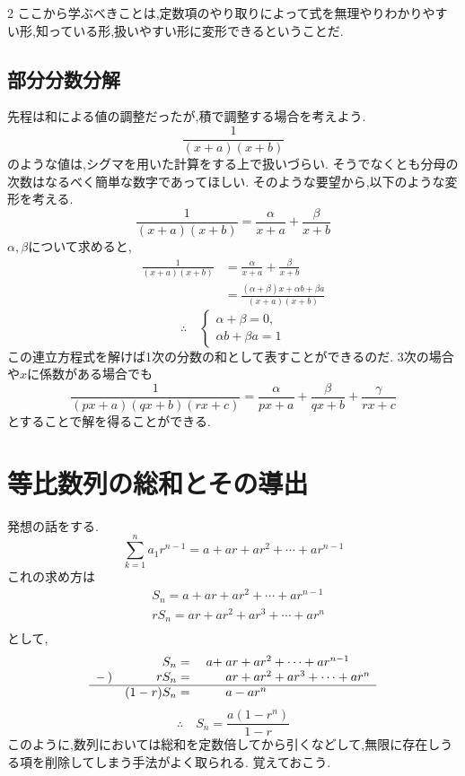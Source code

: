 \documentclass[dvipdfmx,a4paper,11pt,fleqn,openany]{jsbook}
\begin{document}
\begin{multicols*}{2}
      ここから学ぶべきことは,定数項のやり取りによって式を無理やりわかりやすい形,知っている形,扱いやすい形に変形できるということだ.

    \subsection{部分分数分解}
      先程は和による値の調整だったが,積で調整する場合を考えよう.
      \[
        \frac{1}{(x+a)(x+b)}
      \]
      のような値は,シグマを用いた計算をする上で扱いづらい.
      そうでなくとも分母の次数はなるべく簡単な数字であってほしい.
      そのような要望から,以下のような変形を考える.
      \[
        \frac{1}{(x+a)(x+b)}=\frac{\alpha}{x+a}+\frac{\beta}{x+b}
      \]
      $\alpha,\beta$について求めると,
      \begin{align*}
      \frac{1}{(x+a)(x+b)}
        &= \frac{\alpha}{x+a}+\frac{\beta}{x+b}\\
        &= \frac{(\alpha+\beta)x+\alpha b+\beta a}
        {(x+a)(x+b)}
      \end{align*}
      \[
      \therefore\quad
      \begin{cases}
      \alpha+\beta=0,\\
      \alpha b+\beta a=1
      \end{cases}
      \]
      この連立方程式を解けば1次の分数の和として表すことができるのだ.
      3次の場合や$x$に係数がある場合でも
      \[
        \frac{1}{(px+a)(qx+b)(rx+c)}=\frac{\alpha}{px+a}+\frac{\beta}{qx+b}+\frac{\gamma}{rx+c}
      \]
      とすることで解を得ることができる.

  \section{等比数列の総和とその導出}
    発想の話をする.
    \[
      \sum_{k=1}^{n} a_1r^{n-1}=a+ar+ar^2+\cdots+ar^{n-1}
    \]
    これの求め方は
    \begin{align*}
      &S_{n}=a+ar+ar^2+\cdots+ar^{n-1} \tag*{\(\cdots\) (1)}\\
      &rS_n=ar+ar^2+ar^3+\cdots+ar^{n} \tag*{\(\cdots\) (2)}\\
    \end{align*}
    として,
    \[
    \begin{array}{rrrl}
        &S_{n}={}&a+&\hspace{-0.75em}ar+ar^2+\cdots+ar^{n-1}\\
      -\,) & rS_n={}&{}&\hspace{-0.75em}ar+ar^2+ar^3+\cdots+ar^{n}\\ \hline
        & (1-r)S_n={}&{}&\hspace{-0.75em}a-ar^n
    \end{array}
    \]
    \[
      \therefore \quad S_n=\frac{a(1-r^n)}{1-r}
    \]
    このように,数列においては総和を定数倍してから引くなどして,無限に存在しうる項を削除してしまう手法がよく取られる.
    覚えておこう.


\end{multicols*}
\end{document}
